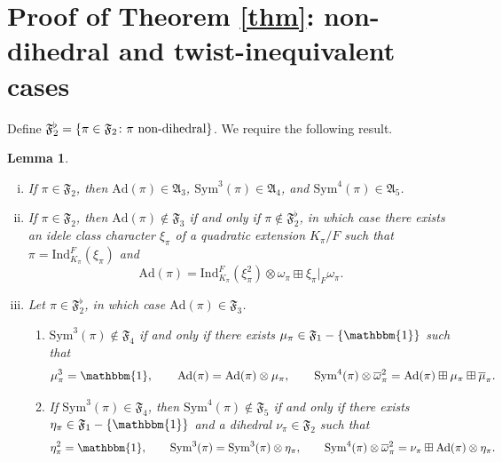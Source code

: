 \documentclass[11pt]{amsart}
\newtheorem{lemma}[theorem]{Lemma}
\theoremstyle{remark}
\numberwithin{equation}{section}
\begin{document}
\section{Proof of Theorem \ref{thm}:  non-dihedral and twist-inequivalent cases}
\label{sec:thm_part1}

Define $\mathfrak{F}_{2}^{\flat}=\{\pi\in\mathfrak{F}_{2}\colon \textup{$\pi$ non-dihedral}\}$.  We require the following result.

\begin{lemma}\cite{GJ,Kim,KimShahidi2,KimShahidi,Ramakrishnan}
\label{lem:decomp}
\begin{enumerate}[(i)]
	\item If $\pi\in\mathfrak{F}_{2}$, then $\mathrm{Ad}(\pi)\in\mathfrak{A}_{3}$, $\mathrm{Sym}^3(\pi)\in\mathfrak{A}_{4}$, and $\mathrm{Sym}^4(\pi)\in\mathfrak{A}_{5}$.
	\item If $\pi\in\mathfrak{F}_{2}$, then $\mathrm{Ad}(\pi)\notin\mathfrak{F}_{3}$ if and only if $\pi\notin\mathfrak{F}_{2}^{\flat}$, in which case there exists an idele class character $\xi_{\pi}$ of a quadratic extension $K_{\pi}/F$ such that $\pi=\mathrm{Ind}_{K_{\pi}}^{F}(\xi_{\pi})$ and
	\[
	\mathrm{Ad}(\pi) = \mathrm{Ind}_{K_{\pi}}^{F}(\xi_{\pi}^2)\otimes \omega_{\pi}\boxplus \xi_{\pi}|_F \omega_{\pi}.
	\]
	\item Let $\pi\in\mathfrak{F}_{2}^{\flat}$, in which case $\mathrm{Ad}(\pi)\in\mathfrak{F}_{3}$.
	\begin{enumerate}
	\item $\mathrm{Sym}^3(\pi)\notin\mathfrak{F}_{4}$ if and only if there exists $\mu_{\pi}\in\mathfrak{F}_{1}-\{\mathbbm{1}\}$ such that
	\[
	\mu_{\pi}^3=\mathbbm{1},\qquad \mathrm{Ad}(\pi)=\mathrm{Ad}(\pi)\otimes\mu_{\pi},\qquad \mathrm{Sym}^4(\pi)\otimes\overline{\omega}_{\pi}^{2} = \mathrm{Ad}(\pi)\boxplus \mu_{\pi}\boxplus\overline{\mu}_{\pi}.
	\]
	\item If $\mathrm{Sym}^3(\pi)\in\mathfrak{F}_{4}$, then $\mathrm{Sym}^4(\pi)\notin\mathfrak{F}_{5}$ if and only if there exists $\eta_{\pi}\in\mathfrak{F}_{1}-\{\mathbbm{1}\}$ and a dihedral $\nu_{\pi}\in\mathfrak{F}_{2}$ such that
	\[
	\eta_{\pi}^2=\mathbbm{1},\qquad \mathrm{Sym}^3(\pi)=\mathrm{Sym}^3(\pi)\otimes\eta_{\pi},\qquad \mathrm{Sym}^4(\pi)\otimes\overline{\omega}_{\pi}^{2} =  \nu_{\pi} \boxplus \mathrm{Ad}(\pi)\otimes\eta_{\pi}.
	\]
	\end{enumerate}
\end{enumerate}
\end{lemma}
\end{document}
